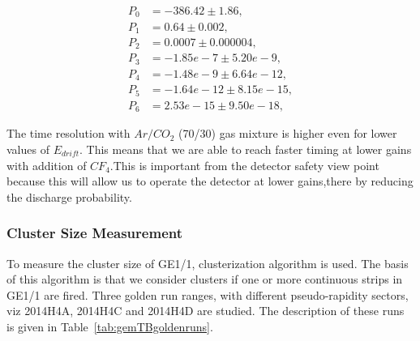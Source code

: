 \begin{align*}
    P_0 & =  -386.42 \pm 1.86,  \nonumber \\
    P_1 & =  0.64 \pm 0.002, \nonumber \\
    P_2 & =  0.0007 \pm 0.000004, \nonumber \\
    P_3 & =  -1.85e-7 \pm 5.20e-9 , \nonumber \\
    P_4 & =  -1.48e-9 \pm  6.64e-12, \nonumber \\
    P_5 & =  -1.64e-12 \pm 8.15e-15 , \nonumber \\
    P_6 & =  2.53e-15 \pm 9.50e-18 , \nonumber 
\end{align*}

The time resolution with $Ar/CO_2$ (70/30) gas mixture is higher even for lower values of $E_{drift}$.
This means that we are able to reach faster timing at lower gains with addition of $CF_4$.This is important from the detector safety view point because this will allow us to operate the detector at lower gains,there by reducing the discharge probability.

\subsubsection{Cluster Size Measurement}
To measure the cluster size of GE1/1, clusterization algorithm is used.
The basis of this algorithm is that we consider clusters if one or more continuous strips in GE1/1 are fired.
Three golden run ranges, with different pseudo-rapidity sectors, viz 2014H4A, 2014H4C and 2014H4D are studied.
The description of these runs is given in Table~\ref{tab:gemTBgoldenruns}.


